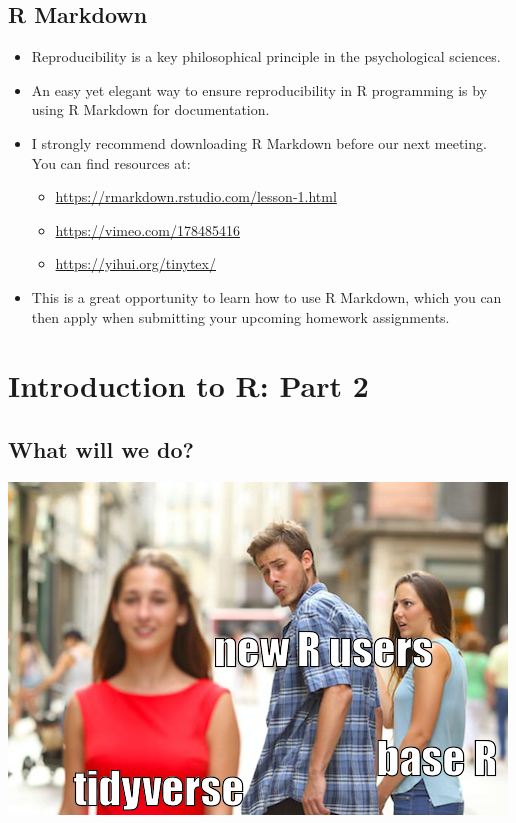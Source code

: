 \documentclass[
]{book}
\providecommand{\tightlist}{%
  \setlength{\itemsep}{0pt}\setlength{\parskip}{0pt}}
\begin{document}
\section{R Markdown}\label{r-markdown}

\begin{itemize}
\item
  Reproducibility is a key philosophical principle in the psychological sciences.
\item
  An easy yet elegant way to ensure reproducibility in R programming is by using R Markdown for documentation.
\item
  I strongly recommend downloading R Markdown before our next meeting. You can find resources at:

  \begin{itemize}
  \tightlist
  \item
    \url{https://rmarkdown.rstudio.com/lesson-1.html}
  \item
    \url{https://vimeo.com/178485416}
  \item
    \url{https://yihui.org/tinytex/}
  \end{itemize}
\item
  This is a great opportunity to learn how to use R Markdown, which you can then apply when submitting your upcoming homework assignments.
\end{itemize}

\chapter{Introduction to R: Part 2}\label{introduction-to-r-part-2}

\section{What will we do?}\label{what-will-we-do}

\includegraphics{./img/tidyverse_meme.png}
\end{document}
